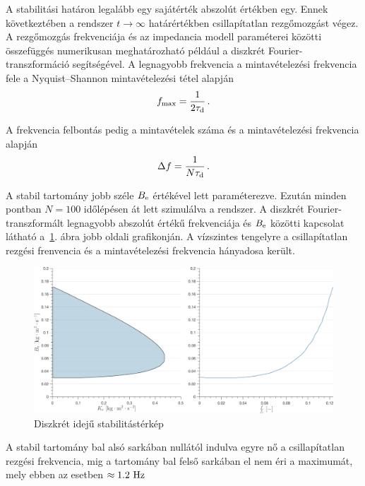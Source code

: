 A stabilitási határon legalább egy sajátérték abszolút értékben egy. Ennek következtében a rendszer 
\(t\rightarrow\infty\) határértékben csillapítatlan rezgőmozgást végez. A rezgőmozgás frekvenciája és az 
impedancia modell paraméterei közötti összefüggés numerikusan meghatározható például a diszkrét 
Fourier-transzformáció segítségével. A legnagyobb frekvencia a mintavételezési frekvencia fele a Nyquist--Shannon 
mintavételezési tétel alapján 
\begin{align}
    f_{\mathrm{max}} = \frac{1}{2\tau_{\mathrm{d}}}\,.
\end{align}

A frekvencia felbontás pedig a mintavételek száma és a mintavételezési frekvencia alapján
\begin{align}
    \Delta f = \frac{1}{N\tau_{\mathrm{d}}}\,.
\end{align}

A stabil tartomány jobb széle \(B_{\mathrm{e}}\) értékével lett paraméterezve. Ezután minden pontban  
\(N = 100\) időlépésen át lett szimulálva a rendszer. A diszkrét Fourier-transzformált 
legnagyobb abszolút értékű frekvenciája és \(B_{\mathrm{e}}\) közötti kapcsolat látható 
a~\ref{fig:time_delay_stab_map_discrete_fourier}. ábra jobb oldali grafikonján. A vízszintes 
tengelyre a csillapítatlan rezgési frenvencia és a mintavételezési frekvencia hányadosa került.
\begin{figure}[H]
    \begin{center}
    \includegraphics[width=\textwidth]{images/time_delay_stab_map_discrete_fourier.png}
    \caption{Diszkrét idejű stabilitástérkép}\label{fig:time_delay_stab_map_discrete_fourier}
    \end{center}
\end{figure}
A stabil tartomány bal alsó sarkában nullától indulva egyre nő a csillapítatlan 
rezgési frekvencia, mig a tartomány bal felső sarkában el nem éri a maximumát, mely ebben az 
esetben \(\approx 1.2~\mathrm{Hz}\)
